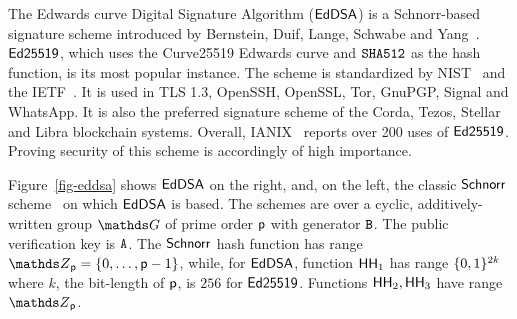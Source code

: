 
  The Edwards curve Digital Signature Algorithm ($\mathsf{EdDSA}$) is a Schnorr-based signature scheme introduced by Bernstein, Duif, Lange, Schwabe and Yang~\cite{bernstein2012high}. $\mathsf{Ed25519}$, which uses the Curve25519 Edwards curve and $\texttt{SHA512}$ as the hash function, is its most popular instance. The scheme is standardized by NIST~\cite{NIST:EdDSA} and the IETF~\cite{RFC:EDDSA}. It is used in TLS 1.3, OpenSSH, OpenSSL, Tor, GnuPGP, Signal and WhatsApp. It is also the preferred signature scheme of the Corda, Tezos, Stellar and Libra blockchain systems. Overall, IANIX~\cite{Ed-uses} reports over 200 uses of $\mathsf{Ed25519}$. Proving security of this scheme is accordingly of high importance.
 
  Figure~\ref{fig-eddsa} shows $\mathsf{EdDSA}$ on the right, and, on the left, the classic $\mathsf{Schnorr}$ scheme~\cite{JC:Schnorr91} on which $\mathsf{EdDSA}$ is based. %
  The schemes are over a cyclic, additively-written group $\group$ of prime order $\mathsf{p}$ with generator $\mathtt{B}$. The public verification key is $\mathtt{A}$. The $\mathsf{Schnorr}$ hash function has range $\Z_{\Prime} = \{0,\ldots,\Prime-1\}$, while, for $\mathsf{EdDSA}$, function $\mathsf{HH}_1$ has range $\{0,1\}^{2k}$ where $k$, the bit-length of $\mathsf{p}$, is $256$ for $\mathsf{Ed25519}$. Functions $\mathsf{HH}_2,\mathsf{HH}_3$ have range $\Z_{\Prime}$.

